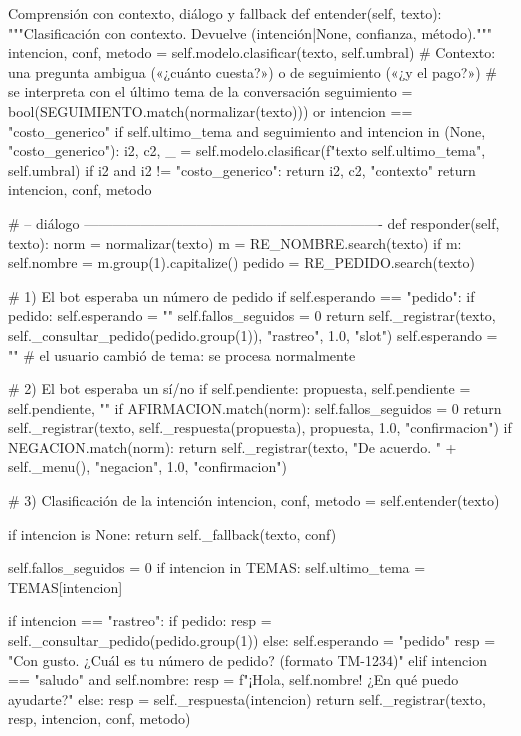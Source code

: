 \documentclass[11pt,letterpaper]{article}
\begin{document}
\begin{codigo}[label=cod:bot]{Comprensión con contexto, diálogo y fallback}
    def entender(self, texto):
        """Clasificación con contexto. Devuelve (intención|None, confianza, método)."""
        intencion, conf, metodo = self.modelo.clasificar(texto, self.umbral)
        # Contexto: una pregunta ambigua («¿cuánto cuesta?») o de seguimiento («¿y el pago?»)
        # se interpreta con el último tema de la conversación
        seguimiento = bool(SEGUIMIENTO.match(normalizar(texto))) or intencion == "costo_generico"
        if self.ultimo_tema and seguimiento and intencion in (None, "costo_generico"):
            i2, c2, _ = self.modelo.clasificar(f"{texto} {self.ultimo_tema}", self.umbral)
            if i2 and i2 != "costo_generico":
                return i2, c2, "contexto"
        return intencion, conf, metodo

    # -- diálogo ----------------------------------------------------------------
    def responder(self, texto):
        norm = normalizar(texto)
        m = RE_NOMBRE.search(texto)
        if m:
            self.nombre = m.group(1).capitalize()
        pedido = RE_PEDIDO.search(texto)

        # 1) El bot esperaba un número de pedido
        if self.esperando == "pedido":
            if pedido:
                self.esperando = ""
                self.fallos_seguidos = 0
                return self._registrar(texto, self._consultar_pedido(pedido.group(1)), "rastreo", 1.0, "slot")
            self.esperando = ""        # el usuario cambió de tema: se procesa normalmente

        # 2) El bot esperaba un sí/no
        if self.pendiente:
            propuesta, self.pendiente = self.pendiente, ""
            if AFIRMACION.match(norm):
                self.fallos_seguidos = 0
                return self._registrar(texto, self._respuesta(propuesta), propuesta, 1.0, "confirmacion")
            if NEGACION.match(norm):
                return self._registrar(texto, "De acuerdo. " + self._menu(), "negacion", 1.0, "confirmacion")

        # 3) Clasificación de la intención
        intencion, conf, metodo = self.entender(texto)

        if intencion is None:
            return self._fallback(texto, conf)

        self.fallos_seguidos = 0
        if intencion in TEMAS:
            self.ultimo_tema = TEMAS[intencion]

        if intencion == "rastreo":
            if pedido:
                resp = self._consultar_pedido(pedido.group(1))
            else:
                self.esperando = "pedido"
                resp = "Con gusto. ¿Cuál es tu número de pedido? (formato TM-1234)"
        elif intencion == "saludo" and self.nombre:
            resp = f"¡Hola, {self.nombre}! ¿En qué puedo ayudarte?"
        else:
            resp = self._respuesta(intencion)
        return self._registrar(texto, resp, intencion, conf, metodo)


\end{codigo}
\end{document}
